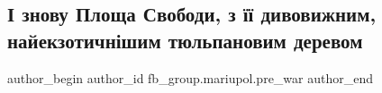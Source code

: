  
 
 
 
 

\subsection{І знову Площа Свободи, з її дивовижним, найекзотичнішим тюльпановим деревом}
\label{sec:05_02_2023.fb.fb_group.mariupol.pre_war.5.__znovu_ploshcha_svo}

\ifcmt
 author_begin
   author_id fb_group.mariupol.pre_war
 author_end
\fi
